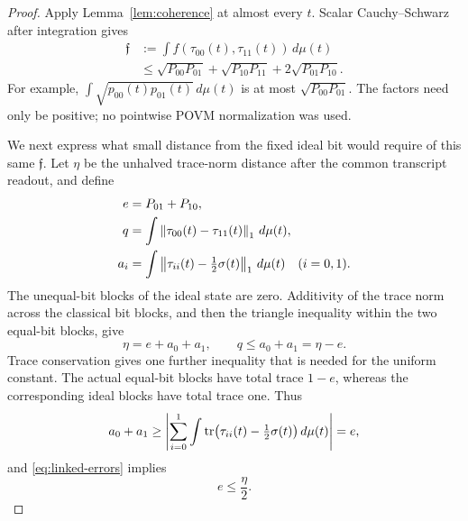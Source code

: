 \begin{proof}
Apply Lemma~\ref{lem:coherence} at almost every $t$.  Scalar
Cauchy--Schwarz after integration gives
\begin{equation}\label{eq:integrated-coherence}
 \begin{split}
 \mathfrak f
 &:=\int f(\tau_{00}(t),\tau_{11}(t))\,d\mu(t)\\
 &\le\sqrt{P_{00}P_{01}}+\sqrt{P_{10}P_{11}}
       +2\sqrt{P_{01}P_{10}}.
 \end{split}
\end{equation}
For example, $\int\sqrt{p_{00}(t)p_{01}(t)}\,d\mu(t)$ is at most
$\sqrt{P_{00}P_{01}}$.  The factors need only be positive; no
pointwise POVM normalization was used.

We next express what small distance from the fixed ideal bit would
require of this same $\mathfrak f$.  Let $\eta$ be the unhalved
trace-norm distance after the common transcript readout, and define
\[
 \begin{split}
 e&=P_{01}+P_{10},\\
 q&=\int\left\lVert\tau_{00}(t)-\tau_{11}(t)\right\rVert_1\,d\mu(t),\\
 a_i&=\int\left\lVert\tau_{ii}(t)-\tfrac12\sigma(t)\right\rVert_1\,d\mu(t)
       \quad(i=0,1).
 \end{split}
\]
The unequal-bit blocks of the ideal state are zero.  Additivity of the
trace norm across the classical bit blocks, and then the triangle
inequality within the two equal-bit blocks, give
\begin{equation}\label{eq:linked-errors}
 \eta=e+a_0+a_1,\qquad q\le a_0+a_1=\eta-e.
\end{equation}
Trace conservation gives one further inequality that is needed for the
uniform constant.  The actual equal-bit blocks have total trace $1-e$,
whereas the corresponding ideal blocks have total trace one.  Thus
\[
 a_0+a_1
 \ge\left|\sum_{i=0}^1\int
       \operatorname{tr}\bigl(\tau_{ii}(t)-\tfrac12\sigma(t)\bigr)\,d\mu(t)\right|
 =e,
\]
and \eqref{eq:linked-errors} implies
\begin{equation}\label{eq:unequal-error-bound}
 e\le\frac\eta2.
\end{equation}


\end{proof}
